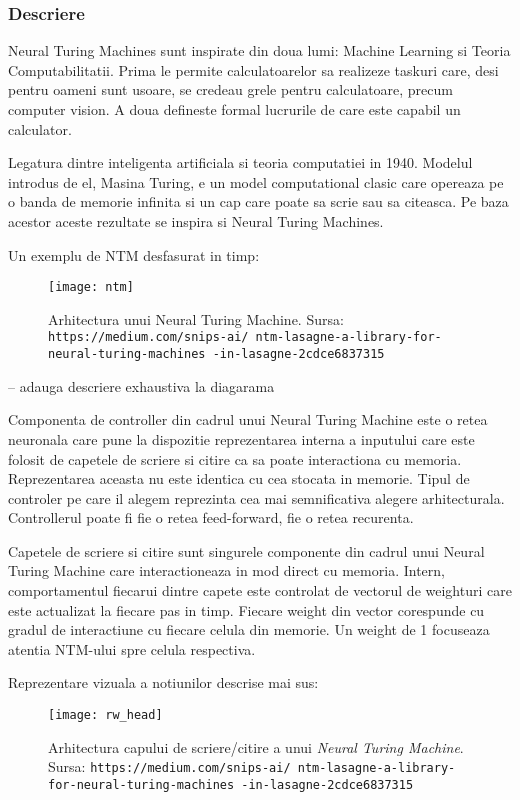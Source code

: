 \documentclass[12pt]{article}
\begin{document}
\subsubsection{Descriere}

Neural Turing Machines sunt inspirate din doua lumi: Machine Learning si Teoria Computabilitatii. Prima le permite calculatoarelor sa realizeze taskuri care, desi pentru oameni sunt usoare, se credeau grele pentru calculatoare, precum computer vision. A doua defineste formal lucrurile de care este capabil un calculator. 

Legatura dintre inteligenta artificiala si teoria computatiei in 1940. Modelul introdus de el, Masina Turing, e un model computational clasic care opereaza pe o banda de memorie infinita si un cap care poate sa scrie sau sa citeasca. Pe baza acestor aceste rezultate se inspira si Neural Turing Machines.

Un exemplu de NTM desfasurat in timp:


\begin{figure}
\centering
\texttt{[image: ntm]}
\\
\caption{Arhitectura unui Neural Turing Machine. Sursa: \texttt{https://medium.com/snips-ai/
ntm-lasagne-a-library-for-neural-turing-machines
-in-lasagne-2cdce6837315}}
\end{figure}

-- adauga descriere exhaustiva la diagarama

Componenta de controller din cadrul unui Neural Turing Machine este o retea neuronala care pune la dispozitie reprezentarea interna a inputului care este folosit de capetele de scriere si citire ca sa poate interactiona cu memoria. Reprezentarea aceasta nu este identica cu cea stocata in memorie. Tipul de controler pe care il alegem reprezinta cea mai semnificativa alegere arhitecturala. Controllerul poate fi fie o retea feed-forward, fie o retea recurenta.

Capetele de scriere si citire sunt singurele componente din cadrul unui Neural Turing Machine care interactioneaza in mod direct cu memoria. Intern, comportamentul fiecarui dintre capete este controlat de vectorul de weighturi care este actualizat la fiecare pas in timp. Fiecare weight din vector corespunde cu gradul de interactiune cu fiecare celula din memorie. Un weight de 1 focuseaza atentia NTM-ului spre celula respectiva.

Reprezentare vizuala a notiunilor descrise mai sus:

\begin{figure}
\centering
\texttt{[image: rw\_head]}
\\
\caption{Arhitectura capului de scriere/citire a unui \textit{Neural Turing Machine}. Sursa: \texttt{https://medium.com/snips-ai/
ntm-lasagne-a-library-for-neural-turing-machines
-in-lasagne-2cdce6837315}}
\end{figure}
\end{document}
